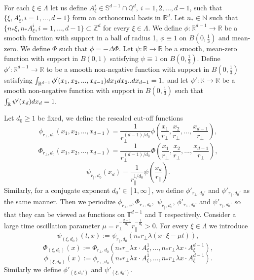 \documentclass[10pt,a4paper]{amsart}
\numberwithin{equation}{section}
\def\dif{{\mathord{{\rm d}}}}
\def\mN{{\mathbb N}}
\def\geq{\geqslant}
\def\dif{{\mathord{{\rm d}}}}
\def\geq{\geqslant}
\begin{document}
For each $\xi\in\Lambda$ let us define $A^i_\xi\in \mathbb{S}^{d-1}\cap \mathbb{Q}^d,\ i=1,2,...,d-1$, such that $\{\xi, A^i_\xi,i=1,...,d-1\}$
form an orthonormal basis in $\mathbb{R}^d$. 
 Let  $n_*\in\mN$ such that$\{n_*\xi, n_*A^i_\xi,i=1,...,d-1\}\subset\mathbb{Z}^d$
for every $\xi\in\Lambda$. 
We define $\phi : \mathbb{R}^{d-1} \to \mathbb{R}$ be a smooth function with support in a ball of radius 1, $\phi\equiv 1$ on $B(0,\frac13)$ and mean-zero. We define $\Phi$ such that $\phi = -\Delta\Phi$. %
Let $\psi : \mathbb{R}\to\mathbb{R}$  be a smooth, mean-zero  function with
support in $B(0,1)$ satisfying $\psi\equiv 1$ on $B(0,\frac13)$. 
Define $\phi' : \mathbb{R}^{d-1} \to \mathbb{R}$ to be a smooth non-negative   function with support in $B(0,\frac13)$ satisfying $\int_{\mathbb{R}^{d-1}}\phi'(x_1,x_2,...,x_{d-1})\dif x_1\dif x_2..\dif x_{d-1}=1,$
and let $\psi' : \mathbb{R} \to \mathbb{R}$ be a smooth non-negative   function with support in $B(0,\frac13)$ such that
$\int_\mathbb{R}\psi'(x_d)\dif x_d=1.$

Let  $d_0\geq1$ be fixed, we define the rescaled cut-off functions
$$\phi _{r_{\perp},{d_0}}(x_1,x_2,...,x_{d-1})=\frac1{r_{\perp}^{(d-1)/{d_0}}}\phi (\frac{x_1}{r_{\perp}},\frac{x_2}{r_{\perp}},...,\frac{x_{d-1}}{r_{\perp}}),$$
$$\Phi _{r_{\perp},{d_0}}(x_1,x_2,...,x_{d-1})=\frac1{r_{\perp}^{(d-1)/{d_0}}}\Phi (\frac{x_1}{r_{\perp}},\frac{x_2}{r_{\perp}},...,\frac{x_{d-1}}{r_{\perp}}),$$
$$\psi _{r_{\parallel},{d_0}}(x_d)=\frac1{r_{\parallel}^{1/{d_0}}}\psi (\frac{x_d}{r_{\parallel}}).$$
Similarly,  for a conjugate exponent $d_0'\in[1,\infty]$, we define $\phi '_{r_{\perp},d_0'}$ and $\psi'_{r_{\parallel},d_0'}$ as the same manner. Then we periodize $\phi _{r_{\perp},v},\Phi _{r_{\perp},{d_0}},$ $\psi _{r_{\parallel},{d_0}}$, $\phi '_{r_{\perp},d_0'}$ and $\psi'_{r_{\parallel},{d_0}'}$ so that they can be viewed as functions on $\mathbb{T}^{d-1}$ and $\mathbb{T}$ respectively.
Consider a large time oscillation parameter $  \mu=r_\perp^{-\frac{d-1}{d_0}}r_\parallel^{-\frac1{d_0}}> 0$. For every $\xi\in\Lambda$ we introduce
$$\psi _{(\xi,d_0)}(t,x):=
\psi _{r_{\parallel},d_0}(n_*r_{\perp}\lambda(x\cdot \xi-\mu t)),$$
$$\Phi _{(\xi,d_0)}(x):=
\Phi _{r_{\perp},d_0}(n_*r_{\perp}\lambda x\cdot A^1_{\xi},...,n_*r_{\perp}\lambda x\cdot A^{d-1}_{\xi}),$$
$$\phi _{(\xi,d_0)}(x):=
\phi _{r_{\perp},d_0}(n_*r_{\perp}\lambda x\cdot A^1_{\xi},...,n_*r_{\perp}\lambda x\cdot A^{d-1}_{\xi}).$$
Similarly  we define  $\phi '_{(\xi,d_0')}$  and $\psi'_{(\xi,d_0')}$. 
\end{document}
